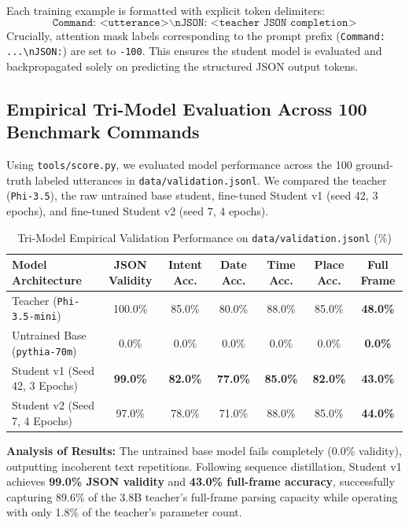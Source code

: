 \documentclass[10pt,a4paper]{article}
\begin{document}
Each training example is formatted with explicit token delimiters:
$$\texttt{Command: <utterance>}\backslash\texttt{nJSON: <teacher JSON completion>}$$
Crucially, attention mask labels corresponding to the prompt prefix (\texttt{Command: ...\textbackslash nJSON:}) are set to \texttt{-100}. This ensures the student model is evaluated and backpropagated solely on predicting the structured JSON output tokens.

\subsection{Empirical Tri-Model Evaluation Across 100 Benchmark Commands}
Using \texttt{tools/score.py}, we evaluated model performance across the 100 ground-truth labeled utterances in \texttt{data/validation.jsonl}. We compared the teacher (\texttt{Phi-3.5}), the raw untrained base student, fine-tuned Student v1 (seed 42, 3 epochs), and fine-tuned Student v2 (seed 7, 4 epochs).

\begin{table}[h!]
\centering
\footnotesize
\caption{Tri-Model Empirical Validation Performance on \texttt{data/validation.jsonl} (\%)}
\vspace{0.1cm}
\begin{tabular*}{\textwidth}{@{\extracolsep{\fill}}lcccccc@{}}
\toprule
\textbf{Model Architecture} & \textbf{JSON Validity} & \textbf{Intent Acc.} & \textbf{Date Acc.} & \textbf{Time Acc.} & \textbf{Place Acc.} & \textbf{Full Frame} \\
\midrule
Teacher (\texttt{Phi-3.5-mini}) & 100.0\% & 85.0\% & 80.0\% & 88.0\% & 85.0\% & \textbf{48.0\%} \\
Untrained Base (\texttt{pythia-70m}) & 0.0\% & 0.0\% & 0.0\% & 0.0\% & 0.0\% & \textbf{0.0\%} \\
Student v1 (Seed 42, 3 Epochs) & \textbf{99.0\%} & \textbf{82.0\%} & \textbf{77.0\%} & \textbf{85.0\%} & \textbf{82.0\%} & \textbf{43.0\%} \\
Student v2 (Seed 7, 4 Epochs) & 97.0\% & 78.0\% & 71.0\% & 88.0\% & 85.0\% & \textbf{44.0\%} \\
\bottomrule
\end{tabular*}
\end{table}

\textbf{Analysis of Results:} The untrained base model fails completely (0.0\% validity), outputting incoherent text repetitions. Following sequence distillation, Student v1 achieves \textbf{99.0\% JSON validity} and \textbf{43.0\% full-frame accuracy}, successfully capturing 89.6\% of the 3.8B teacher's full-frame parsing capacity while operating with only 1.8\% of the teacher's parameter count.
\end{document}

